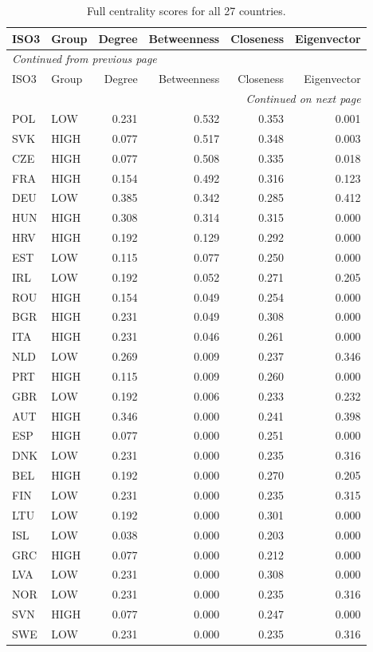 \documentclass[12pt,a4paper]{article}
\begin{document}
\begin{longtable}{@{}llrrrr@{}}
\caption{Full centrality scores for all 27 countries.}\label{tab:centrality}\\
\toprule
ISO3 & Group & Degree & Betweenness & Closeness & Eigenvector \\
\midrule
\endfirsthead
\multicolumn{6}{l}{\small\textit{Continued from previous page}}\\
\toprule
ISO3 & Group & Degree & Betweenness & Closeness & Eigenvector \\
\midrule
\endhead
\midrule
\multicolumn{6}{r}{\small\textit{Continued on next page}}\\
\endfoot
\bottomrule
\endlastfoot
POL & LOW  & 0.231 & 0.532 & 0.353 & 0.001 \\
SVK & HIGH & 0.077 & 0.517 & 0.348 & 0.003 \\
CZE & HIGH & 0.077 & 0.508 & 0.335 & 0.018 \\
FRA & HIGH & 0.154 & 0.492 & 0.316 & 0.123 \\
DEU & LOW  & 0.385 & 0.342 & 0.285 & 0.412 \\
HUN & HIGH & 0.308 & 0.314 & 0.315 & 0.000 \\
HRV & HIGH & 0.192 & 0.129 & 0.292 & 0.000 \\
EST & LOW  & 0.115 & 0.077 & 0.250 & 0.000 \\
IRL & LOW  & 0.192 & 0.052 & 0.271 & 0.205 \\
ROU & HIGH & 0.154 & 0.049 & 0.254 & 0.000 \\
BGR & HIGH & 0.231 & 0.049 & 0.308 & 0.000 \\
ITA & HIGH & 0.231 & 0.046 & 0.261 & 0.000 \\
NLD & LOW  & 0.269 & 0.009 & 0.237 & 0.346 \\
PRT & HIGH & 0.115 & 0.009 & 0.260 & 0.000 \\
GBR & LOW  & 0.192 & 0.006 & 0.233 & 0.232 \\
AUT & HIGH & 0.346 & 0.000 & 0.241 & 0.398 \\
ESP & HIGH & 0.077 & 0.000 & 0.251 & 0.000 \\
DNK & LOW  & 0.231 & 0.000 & 0.235 & 0.316 \\
BEL & HIGH & 0.192 & 0.000 & 0.270 & 0.205 \\
FIN & LOW  & 0.231 & 0.000 & 0.235 & 0.315 \\
LTU & LOW  & 0.192 & 0.000 & 0.301 & 0.000 \\
ISL & LOW  & 0.038 & 0.000 & 0.203 & 0.000 \\
GRC & HIGH & 0.077 & 0.000 & 0.212 & 0.000 \\
LVA & LOW  & 0.231 & 0.000 & 0.308 & 0.000 \\
NOR & LOW  & 0.231 & 0.000 & 0.235 & 0.316 \\
SVN & HIGH & 0.077 & 0.000 & 0.247 & 0.000 \\
SWE & LOW  & 0.231 & 0.000 & 0.235 & 0.316 \\
\end{longtable}
\end{document}

